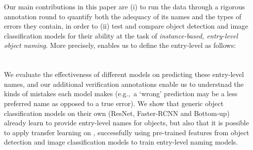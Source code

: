 Our main contributions in this paper are (i) to run the \mn data through a rigorous annotation round to quantify both the adequacy of its names and the types of errors they contain, in order to (ii) test and compare object detection and image classification models for their ability at the task of \emph{instance-based, entry-level object naming}. More precisely, \mn enables us to define the entry-level as follows:\\
\\\\
We evaluate the effectiveness of different models on predicting these entry-level names, and our additional verification annotations enable us to understnad the kinds of mistakes each model makes (e.g.,~a `wrong' prediction may be a less preferred name as opposed to a true error).
We show that generic object classification models on their own (ResNet, Faster-RCNN and Bottom-up) already learn to provide entry-level names for objects, but also that it is possible to apply transfer learning on \mn, successfully using pre-trained features from object detection and image classification models to train entry-level naming models. 


%


\iffalse


